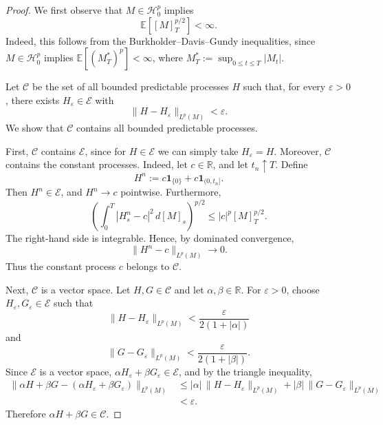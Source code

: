 \documentclass[11pt]{report}
\theoremstyle{plain} %
\theoremstyle{definition} %
\theoremstyle{remark} %
\begin{document}
\begin{proof}
We first observe that \(M \in \mathcal H^p_0\) implies
\[
    \mathbb E\left[[M]_T^{p/2}\right] < \infty .
\]
Indeed, this follows from the Burkholder--Davis--Gundy inequalities, since
\(M \in \mathcal H^p_0\) implies \(\mathbb E[(M_T^*)^p] < \infty\), where
\(M_T^* := \sup_{0 \leq t \leq T} |M_t|\).

Let \(\mathcal C\) be the set of all bounded predictable processes \(H\) such that, for
every \(\varepsilon>0\), there exists \(H_\varepsilon \in \mathcal E\) with
\[
    \|H-H_\varepsilon\|_{L^p(M)} < \varepsilon .
\]
We show that \(\mathcal C\) contains all bounded predictable processes.

First, \(\mathcal C\) contains \(\mathcal E\), since for \(H\in\mathcal E\) we can simply
take \(H_\varepsilon=H\). Moreover, \(\mathcal C\) contains the constant processes. Indeed,
let \(c\in\mathbb R\), and let \(t_n\uparrow T\). Define
\[
    H^n := c\mathbf 1_{\{0\}} + c\mathbf 1_{(0,t_n]} .
\]
Then \(H^n\in\mathcal E\), and \(H^n\to c\) pointwise. Furthermore,
\[
    \left(
        \int_0^T |H^n_s-c|^2\,d[M]_s
    \right)^{p/2}
    \leq
    |c|^p [M]_T^{p/2}.
\]
The right-hand side is integrable. Hence, by dominated convergence,
\[
    \|H^n-c\|_{L^p(M)} \to 0 .
\]
Thus the constant process \(c\) belongs to \(\mathcal C\).

Next, \(\mathcal C\) is a vector space. Let \(H,G\in\mathcal C\) and let
\(\alpha,\beta\in\mathbb R\). For \(\varepsilon>0\), choose
\(H_\varepsilon,G_\varepsilon\in\mathcal E\) such that
\[
    \|H-H_\varepsilon\|_{L^p(M)}
    <
    \frac{\varepsilon}{2(1+|\alpha|)}
\]
and
\[
    \|G-G_\varepsilon\|_{L^p(M)}
    <
    \frac{\varepsilon}{2(1+|\beta|)} .
\]
Since \(\mathcal E\) is a vector space, \(\alpha H_\varepsilon+\beta G_\varepsilon\in
\mathcal E\), and by the triangle inequality,
\[
\begin{aligned}
    \|\alpha H+\beta G-(\alpha H_\varepsilon+\beta G_\varepsilon)\|_{L^p(M)}
    &\leq
    |\alpha|\,\|H-H_\varepsilon\|_{L^p(M)}
    +
    |\beta|\,\|G-G_\varepsilon\|_{L^p(M)}  \\
    &< \varepsilon .
\end{aligned}
\]
Therefore \(\alpha H+\beta G\in\mathcal C\).


\end{proof}
\end{document}
